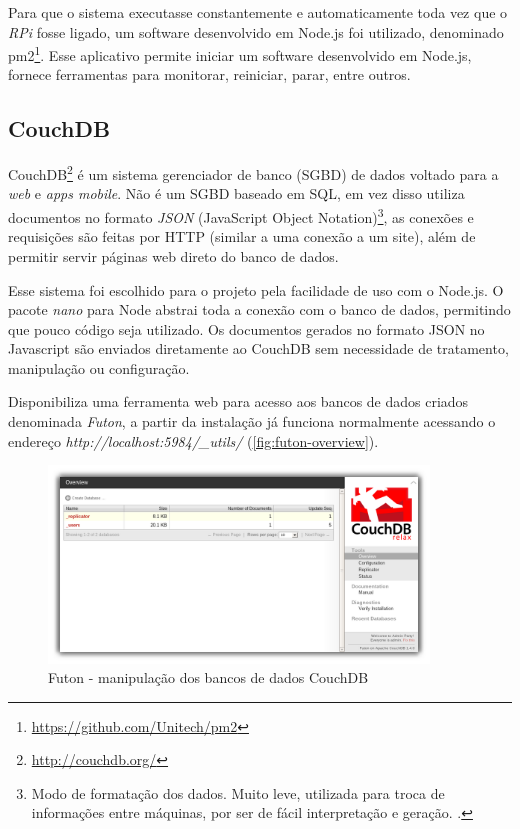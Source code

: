 \documentclass[
		12pt,				%
		openright,			%
		oneside,			%
		a4paper,			%
		chapter=TITLE,		%
		english,			%
		brazil				%
	]{abntex2}
\begin{document}
Para que o sistema executasse constantemente e automaticamente toda vez que o \textit{RPi} fosse ligado, um software desenvolvido em Node.js foi utilizado, denominado pm2\footnote{\url{https://github.com/Unitech/pm2}}. Esse aplicativo permite iniciar um software desenvolvido em Node.js, fornece ferramentas para monitorar, reiniciar, parar, entre outros.

\subsection{CouchDB}\label{sec:couchdb}

CouchDB\footnote{\url{http://couchdb.org/}} é um sistema gerenciador de banco (SGBD) de dados voltado para a \textit{web} e \textit{apps mobile}. Não é um SGBD baseado em SQL, em vez disso utiliza documentos no formato \textit{JSON} (JavaScript Object Notation)\footnote{Modo de formatação dos dados. Muito leve, utilizada para troca de informações entre máquinas, por ser de fácil interpretação e geração. \cite{json-couch}.}, as conexões e requisições são feitas por HTTP (similar a uma conexão a um site), além de permitir servir páginas web direto do banco de dados.

Esse sistema foi escolhido para o projeto pela facilidade de uso com o Node.js. O pacote \textit{nano} para Node abstrai toda a conexão com o banco de dados, permitindo que pouco código seja utilizado. Os documentos gerados no formato JSON no Javascript são enviados diretamente ao CouchDB sem necessidade de tratamento, manipulação ou configuração.

Disponibiliza uma ferramenta web para acesso aos bancos de dados criados denominada \textit{Futon}, a partir da instalação já funciona normalmente acessando o endereço \textit{http://localhost:5984/\_utils/} (\autoref{fig:futon-overview}).

\begin{figure}[htb]
	\caption{\label{fig:futon-overview}Futon - manipulação dos bancos de dados CouchDB}
	\begin{center}
		\includegraphics[width=0.9\textwidth]{img/futon-overview.png}
	\end{center}
\end{figure}
\end{document}

